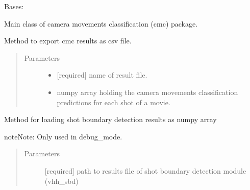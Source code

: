 \documentclass[letterpaper,10pt,english,openany,oneside]{sphinxmanual}
\begin{document}
\begin{fulllineitems}
\label{\detokenize{CMC:cmc.CMC.CMC}}
Bases: 

Main class of camera movements classification (cmc) package.

\begin{fulllineitems}
\label{\detokenize{CMC:cmc.CMC.CMC.exportCmcResults}}
Method to export cmc results as csv file.
\begin{quote}\begin{description}
\item[{Parameters}] \leavevmode\begin{itemize}
\item {} 
 \textendash{} {[}required{]} name of result file.

\item {} 
 \textendash{} numpy array holding the camera movements classification predictions for each shot of a movie.

\end{itemize}

\end{description}\end{quote}

\end{fulllineitems}


\begin{fulllineitems}
\label{\detokenize{CMC:cmc.CMC.CMC.loadSbdResults}}
Method for loading shot boundary detection results as numpy array

\begin{sphinxadmonition}{note}{Note:}
Only used in debug\_mode.
\end{sphinxadmonition}
\begin{quote}\begin{description}
\item[{Parameters}] \leavevmode
{} \textendash{} {[}required{]} path to results file of shot boundary detection module (vhh\_sbd)


\end{description}
\end{quote}
\end{fulllineitems}
\end{fulllineitems}
\end{document}
